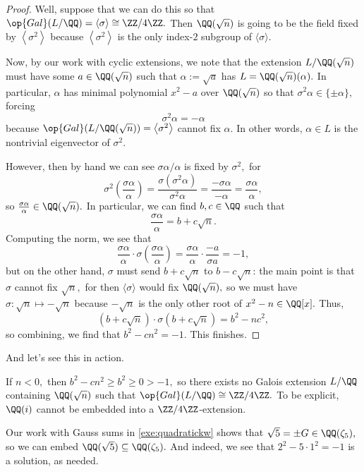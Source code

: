 \begin{proof}
	Well, suppose that we can do this so that $\op{Gal}(L/\QQ)=\langle\sigma\rangle\cong\ZZ/4\ZZ.$ Then $\QQ(\sqrt n)$ is going to be the field fixed by $\left\langle\sigma^2\right\rangle$ because $\left\langle\sigma^2\right\rangle$ is the only index-$2$ subgroup of $\langle\sigma\rangle.$

	Now, by our work with cyclic extensions, we note that the extension $L/\QQ(\sqrt n)$ must have some $a\in\QQ(\sqrt n)$ such that $\alpha:=\sqrt a$ has $L=\QQ(\sqrt n)(\alpha).$ In particular, $\alpha$ has minimal polynomial $x^2-a$ over $\QQ(\sqrt n)$ so that $\sigma^2\alpha\in\{\pm\alpha\},$ forcing
	\[\sigma^2\alpha=-\alpha\]
	because $\op{Gal}(L/\QQ(\sqrt n))=\left\langle\sigma^2\right\rangle$ cannot fix $\alpha.$ In other words, $\alpha\in L$ is the nontrivial eigenvector of $\sigma^2.$
	
	However, then by hand we can see $\sigma\alpha/\alpha$ is fixed by $\sigma^2,$ for
	\[\sigma^2\left(\frac{\sigma\alpha}\alpha\right)=\frac{\sigma\left(\sigma^2\alpha\right)}{\sigma^2\alpha}=\frac{-\sigma\alpha}{-\alpha}=\frac{\sigma\alpha}\alpha,\]
	so $\frac{\sigma\alpha}\alpha\in\QQ(\sqrt n).$ In particular, we can find $b,c\in\QQ$ such that
	\[\frac{\sigma\alpha}\alpha=b+c\sqrt n.\]
	Computing the norm, we see that
	\[\frac{\sigma\alpha}\alpha\cdot\sigma\left(\frac{\sigma\alpha}\alpha\right)=\frac{\sigma\alpha}\alpha\cdot\frac{-a}{\sigma a}=-1,\]
	but on the other hand, $\sigma$ must send $b+c\sqrt n$ to $b-c\sqrt n$: the main point is that $\sigma$ cannot fix $\sqrt n,$ for then $\langle\sigma\rangle$ would fix $\QQ(\sqrt n),$ so we must have $\sigma:\sqrt n\mapsto-\sqrt n$ because $-\sqrt n$ is the only other root of $x^2-n\in\QQ[x].$ Thus,
	\[(b+c\sqrt n)\cdot\sigma(b+c\sqrt n)=b^2-nc^2,\]
	so combining, we find that $b^2-cn^2=-1.$ This finishes.
\end{proof}
And let's see this in action.
\begin{example}
	If $n<0,$ then $b^2-cn^2\ge b^2\ge0>-1,$ so there exists no Galois extension $L/\QQ$ containing $\QQ(\sqrt n)$ such that $\op{Gal}(L/\QQ)\cong\ZZ/4\ZZ.$ To be explicit, $\QQ(i)$ cannot be embedded into a $\ZZ/4\ZZ$-extension.
\end{example}
\begin{example}
	Our work with Gauss sums in \autoref{exe:quadratickw} shows that $\sqrt 5=\pm G\in\QQ(\zeta_5),$ so we can embed $\QQ(\sqrt 5)\subseteq\QQ(\zeta_5).$ And indeed, we see that $2^2-5\cdot1^2=-1$ is a solution, as needed.
\end{example}
